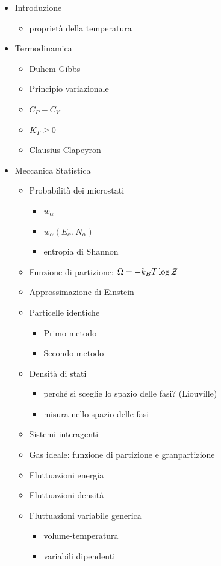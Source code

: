\begin{itemize}
	\item Introduzione
	\begin{itemize}
		\item proprietà della temperatura
	\end{itemize}
	\item Termodinamica
	\begin{itemize}
		\item Duhem-Gibbs
		\item Principio variazionale
		\item $ C_P - C_V $
		\item $ K_T \geq 0 $
		\item Clausius-Clapeyron
	\end{itemize}
	\item Meccanica Statistica
	\begin{itemize}
		\item Probabilità dei microstati
		\begin{itemize}
			\item $ w_\alpha $
			\item $ w_\alpha (E_\alpha,N_\alpha) $
			\item entropia di Shannon
		\end{itemize}
		\item Funzione di partizione: $ \Omega = -k_B T \log\mathcal{Z} $
		\item Approssimazione di Einstein
		\item Particelle identiche
		\begin{itemize}
			\item Primo metodo
			\item Secondo metodo
		\end{itemize}
		\item Densità di stati
		\begin{itemize}
			\item perché si sceglie lo spazio delle fasi? (Liouville)
			\item misura nello spazio delle fasi
		\end{itemize}
		\item Sistemi interagenti
		\item Gas ideale: funzione di partizione e granpartizione
		\item Fluttuazioni energia
		\item Fluttuazioni densità
		\item Fluttuazioni variabile generica
		\begin{itemize}
			\item volume-temperatura
			\item variabili dipendenti
		\end{itemize}
	\end{itemize}
\end{itemize}
